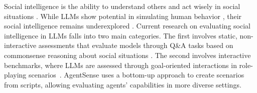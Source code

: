 Social intelligence is the ability to understand others and act wisely in social situations \cite{doi:10.2466/pr0.1973.33.3.839}.
While LLMs show potential in simulating human behavior \cite{xie2024largelanguagemodelagents}, their social intelligence remains underexplored \cite{zhou2024real}.
Current research on evaluating social intelligence in LLMs falls into two main categories.
The first involves static, non-interactive assessments that evaluate models through Q\&A tasks based on commonsense reasoning about social situations \cite{sap2019socialiqacommonsensereasoningsocial,Zadeh_2019_CVPR}.
The second involves interactive benchmarks, where LLMs are assessed through goal-oriented interactions in role-playing scenarios~\cite{zhou2024sotopiainteractiveevaluationsocial,chen2024socialbenchsocialityevaluationroleplaying,wang2024objectivelybenchmarkingsocialintelligence,liu2023agentbenchevaluatingllmsagents}.
AgentSense uses a bottom-up approach to create scenarios from scripts, allowing evaluating agents’ capabilities in more diverse settings.